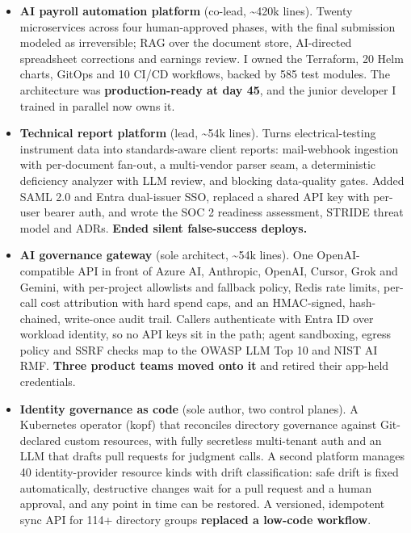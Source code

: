 \documentclass[10pt,letterpaper]{article}
\begin{document}
\begin{itemize}
\item \textbf{AI payroll automation platform} {\color{muted}(co-lead, \textasciitilde{}420k lines)}. Twenty microservices across four human-approved phases, with the final submission modeled as irreversible; RAG over the document store, AI-directed spreadsheet corrections and earnings review. I owned the Terraform, 20 Helm charts, GitOps and 10 CI/CD workflows, backed by 585 test modules. The architecture was \textbf{production-ready at day 45}, and the junior developer I trained in parallel now owns it.
\item \textbf{Technical report platform} {\color{muted}(lead, \textasciitilde{}54k lines)}. Turns electrical-testing instrument data into standards-aware client reports: mail-webhook ingestion with per-document fan-out, a multi-vendor parser seam, a deterministic deficiency analyzer with LLM review, and blocking data-quality gates. Added SAML 2.0 and Entra dual-issuer SSO, replaced a shared API key with per-user bearer auth, and wrote the SOC 2 readiness assessment, STRIDE threat model and ADRs. \textbf{Ended silent false-success deploys.}
\item \textbf{AI governance gateway} {\color{muted}(sole architect, \textasciitilde{}54k lines)}. One OpenAI-compatible API in front of Azure AI, Anthropic, OpenAI, Cursor, Grok and Gemini, with per-project allowlists and fallback policy, Redis rate limits, per-call cost attribution with hard spend caps, and an HMAC-signed, hash-chained, write-once audit trail. Callers authenticate with Entra ID over workload identity, so no API keys sit in the path; agent sandboxing, egress policy and SSRF checks map to the OWASP LLM Top 10 and NIST AI RMF. \textbf{Three product teams moved onto it} and retired their app-held credentials.
\item \textbf{Identity governance as code} {\color{muted}(sole author, two control planes)}. A Kubernetes operator (kopf) that reconciles directory governance against Git-declared custom resources, with fully secretless multi-tenant auth and an LLM that drafts pull requests for judgment calls. A second platform manages 40 identity-provider resource kinds with drift classification: safe drift is fixed automatically, destructive changes wait for a pull request and a human approval, and any point in time can be restored. A versioned, idempotent sync API for 114+ directory groups \textbf{replaced a low-code workflow}.
\end{itemize}
\end{document}
